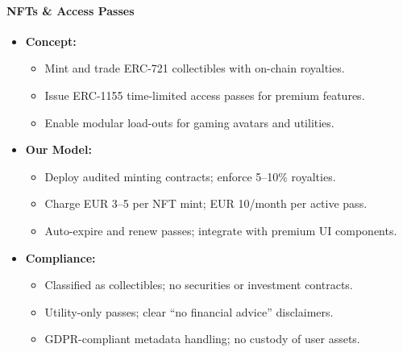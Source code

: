 \documentclass[13pt]{extarticle}
\begin{document}
\paragraph{NFTs \& Access Passes}
\begin{itemize}[left=1em]
  \item \textbf{Concept:}
    \begin{itemize}[left=1.2em]
      \item Mint and trade ERC-721 collectibles with on-chain royalties.
      \item Issue ERC-1155 time-limited access passes for premium features.
      \item Enable modular load-outs for gaming avatars and utilities.
    \end{itemize}
  \item \textbf{Our Model:}
    \begin{itemize}[left=1.2em]
      \item Deploy audited minting contracts; enforce 5–10\% royalties.
      \item Charge EUR 3–5 per NFT mint; EUR 10/month per active pass.
      \item Auto-expire and renew passes; integrate with premium UI components.
    \end{itemize}
  \item \textbf{Compliance:}
    \begin{itemize}[left=1.2em]
      \item Classified as collectibles; no securities or investment contracts.
      \item Utility-only passes; clear “no financial advice” disclaimers.
      \item GDPR-compliant metadata handling; no custody of user assets.
    \end{itemize}
\end{itemize}
\end{document}
